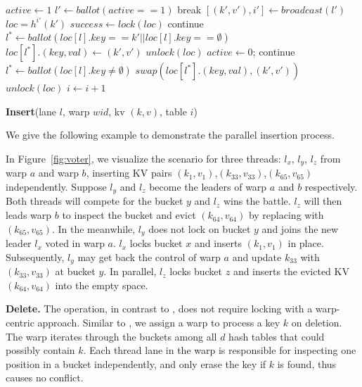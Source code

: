 \begin{algorithm}[t]
	\begin{algorithmic}[1]
		\State $active \gets 1$	\label{algo:insert:active:start}
		\State $l' \gets ballot(active == 1)$ \label{algo:insert:vote:start}
		\State break \label{algo:insert:active:end}
		\EndIf
		\State $[(k',v'),i'] \gets broadcast(l')$ \label{algo:insert:lock:start}
		\State $loc = h^{i'}(k')$
		\State $success \gets lock(loc)$ \label{algo:insert:lock:end}
		\EndIf
		\State continue					\label{algo:insert:vote:end}
		\EndIf
		\State $l^* \gets ballot(loc[l].key == k' || loc[l].key ==\emptyset)$ \label{algo:insert:write:start}
		\State $loc[l^*].(key,val) \gets (k',v')$
		\State $unlock(loc)$
		\State $active \gets 0$;
		\State continue			\label{algo:insert:write:end}
		\EndIf
		\State $l^* \gets ballot(loc[l].key \neq \emptyset)$
		\State $swap(loc[l^*].(key,val),(k',v'))$
		\State $unlock(loc)$
		\State $i \gets i+1$ \label{algo:insert:loop:end}
		\EndIf
		\EndWhile
	\end{algorithmic}
	\caption{\textbf{Insert}(lane $l$, warp $wid$, kv $(k,v)$, table $i$)}\label{algo:insert}
\end{algorithm}

We give the following example to demonstrate the parallel insertion process.
\begin{example}
	In Figure~\ref{fig:voter}, we visualize the scenario for three threads: $l_x$, $l_y$, $l_z$ from warp $a$ and warp $b$, inserting KV pairs $(k_1,v_1)$,$(k_{33},v_{33})$,$(k_{65},v_{65})$ independently. 
	Suppose $l_y$ and $l_z$ become the leaders of warp $a$ and $b$ respectively. Both threads will compete for the bucket $y$ and $l_z$ wins the battle. 
	$l_z$ will then leads warp $b$ to inspect the bucket and evict $(k_{64},v_{64})$ by replacing with $(k_{65},v_{65})$. 
	In the meanwhile, $l_y$ does not lock on bucket $y$ and joins the new leader $l_x$ voted in warp $a$. 
	$l_x$ locks bucket $x$ and inserts $(k_1,v_1)$ in place. Subsequently, $l_y$ may get back the control of warp $a$ and update $k_{33}$ with $(k_{33},v_{33})$ at bucket $y$. In parallel, $l_z$ locks bucket $z$ and inserts the evicted KV $(k_{64},v_{64})$ into the empty space. 
\end{example}

\vspace{1mm}\noindent\textbf{Delete.} The  operation, in contrast to , does not require locking with a warp-centric approach. 
Similar to , we assign a warp to process a key $k$ on deletion. The warp iterates through the buckets among all $d$ hash tables that could possibly contain $k$. Each thread lane in the warp is responsible for inspecting one position in a bucket independently, and only erase the key if $k$ is found, thus causes no conflict.

